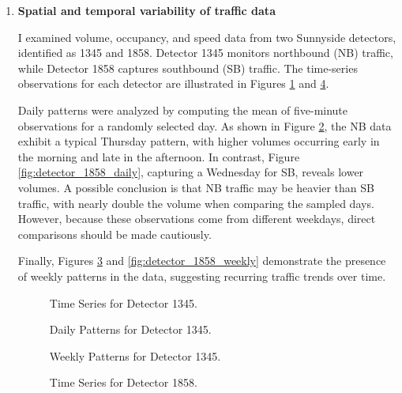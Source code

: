 \documentclass[12pt]{article}
\begin{document}
\begin{enumerate}
\item{\textbf{Spatial and temporal variability of traffic data}}

I examined volume, occupancy, and speed data from two Sunnyside detectors, identified as 1345 and 1858. Detector 1345 monitors northbound (NB) traffic, while Detector 1858 captures southbound (SB) traffic. The time-series observations for each detector are illustrated in Figures \ref{fig:detector_1345_timeseries} and \ref{fig:detector_1858_timeseries}.

Daily patterns were analyzed by computing the mean of five-minute observations for a randomly selected day. As shown in Figure \ref{fig:detector_1345_daily}, the NB data exhibit a typical Thursday pattern, with higher volumes occurring early in the morning and late in the afternoon. In contrast, Figure \ref{fig:detector_1858_daily}, capturing a Wednesday for SB, reveals lower volumes. A possible conclusion is that NB traffic may be heavier than SB traffic, with nearly double the volume when comparing the sampled days. However, because these observations come from different weekdays, direct comparisons should be made cautiously.

Finally, Figures \ref{fig:detector_1345_weekly} and \ref{fig:detector_1858_weekly} demonstrate the presence of weekly patterns in the data, suggesting recurring traffic trends over time.

\begin{figure}[H]
  \centering
  
  \caption{Time Series for Detector 1345.}
  \label{fig:detector_1345_timeseries}
\end{figure}

\begin{figure}[H]
  \centering
  
  \caption{Daily Patterns for Detector 1345.}
  \label{fig:detector_1345_daily}
\end{figure}

\begin{figure}[H]
  \centering
  
  \caption{Weekly Patterns for Detector 1345.}
  \label{fig:detector_1345_weekly}
\end{figure}

\begin{figure}[H]
  \centering
  
  \caption{Time Series for Detector 1858.}
  \label{fig:detector_1858_timeseries}
\end{figure}


\end{enumerate}
\end{document}
